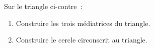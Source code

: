 \documentclass[exercice]{thedocument}%
\begin{document}
%
    \begin{minipage}[c]{0.45\textwidth}
        Sur le triangle ci-contre~:
        \begin{enumerate}
            \item Construire les trois médiatrices du triangle.
            \item Construire le cercle circonscrit au triangle.
        \end{enumerate}
    \end{minipage}
    \begin{minipage}[c]{0.45\textwidth}
        \begin{center}
        \end{center}
    \end{minipage}
\end{document}
